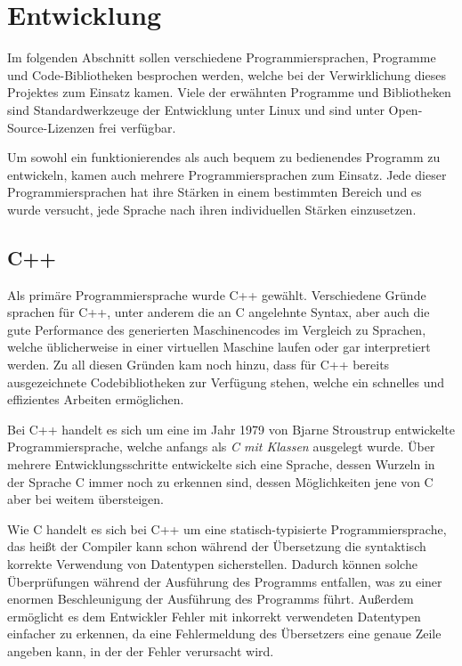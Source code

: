 \chapter{Entwicklung}
Im folgenden Abschnitt sollen verschiedene Programmiersprachen, Programme und Code-Bib\-lio\-theken besprochen werden, welche bei der Verwirklichung dieses Projektes zum Einsatz kamen. 
Viele der erwähnten Programme und Bi\-bli\-o\-the\-ken sind Standardwerkzeuge der Entwicklung unter Linux und sind unter Open-Source-Lizenzen frei verfügbar. 

Um sowohl ein funktionierendes als auch bequem zu bedienendes Programm zu entwickeln, kamen auch mehrere Programmiersprachen zum Einsatz. Jede dieser Programmiersprachen hat ihre Stärken in 
einem bestimmten Bereich und es wurde versucht, jede Sprache nach ihren individuellen Stärken einzusetzen. 

\section{C++}
\label{sec:cpp}
Als primäre Programmiersprache wurde C++ gewählt. Verschiedene Gründe sprachen für C++, unter anderem die an C angelehnte Syntax, aber
auch die gute Performance des generierten Maschinencodes im Vergleich zu Sprachen, welche üblicherweise in einer virtuellen Maschine laufen oder gar interpretiert werden. Zu 
all diesen Gründen kam noch hinzu, dass für C++ bereits ausgezeichnete Codebibliotheken zur Verfügung stehen, welche ein schnelles
und effizientes Arbeiten ermöglichen.

Bei C++ handelt es sich um eine im Jahr 1979 von Bjarne Stroustrup entwickelte Programmiersprache, welche anfangs als \textit{C mit Klassen}
ausgelegt wurde. Über mehrere Ent\-wick\-lungs\-schrit\-te entwickelte sich eine Sprache, dessen Wurzeln in der Sprache C immer noch zu erkennen sind, 
dessen Möglichkeiten jene von C aber bei weitem übersteigen. 

Wie C handelt es sich bei C++ um eine statisch-typisierte Programmiersprache, das heißt der Compiler kann schon während der Übersetzung die
syntaktisch korrekte Verwendung von Datentypen sicherstellen. Dadurch können solche Überprüfungen während der Ausführung des Programms
entfallen, was zu einer enormen Beschleunigung der Ausführung des Programms führt. Außerdem ermöglicht es dem Entwickler Fehler mit
inkorrekt verwendeten Datentypen einfacher zu erkennen, da eine Fehlermeldung des Übersetzers eine genaue Zeile angeben kann, in der 
der Fehler verursacht wird. 

